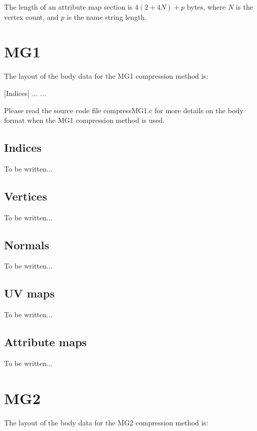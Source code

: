 The length of an attribute map section is $4(2+4N)+p$ bytes, where $N$ is the vertex
count, and $p$ is the name string length.


\section{MG1}
The layout of the body data for the MG1 compression method is:

[Indices]\newline
[Vertices]\newline
[Normals]\newline
[UV map 0]\newline
[UV map 1]\newline
...\newline
[UV map N]\newline
...

Please read the source code file compressMG1.c for more details on the body
format when the MG1 compression method is used.

\subsection{Indices}
To be written...

\subsection{Vertices}
To be written...

\subsection{Normals}
To be written...

\subsection{UV maps}
To be written...

\subsection{Attribute maps}
To be written...


\section{MG2}
The layout of the body data for the MG2 compression method is:

